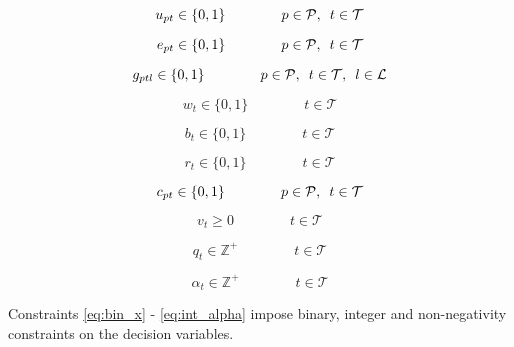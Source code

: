 \begin{equation} \label{eq:bin_u}
    u_{pt} \in \{0,1\} \qquad\qquad p \in \mathcal{P}, \enskip t \in \mathcal{T} 
\end{equation}

\begin{equation} \label{eq:nonn_e}
    e_{pt} \in \{0,1\} \qquad\qquad p \in \mathcal{P}, \enskip t \in \mathcal{T} 
\end{equation}

\begin{equation} \label{eq:binf_g}
    g_{ptl} \in \{0,1\} \qquad\qquad p \in \mathcal{P}, \enskip t \in \mathcal{T},\enskip l \in \mathcal{L}
\end{equation}

\begin{equation} \label{eq:wildcard_bin_w}
    w_{t} \in \{0,1\} \qquad\qquad  t \in \mathcal{T}
\end{equation}

\begin{equation} \label{eq:bench_boost_bin_b}
    b_{t} \in \{0,1\} \qquad\qquad  t \in \mathcal{T}
\end{equation}

\begin{equation} \label{eq:free_hit_bin_r}
    r_{t} \in \{0,1\} \qquad\qquad  t \in \mathcal{T}
\end{equation}

\begin{equation} \label{eq:triple_captain_bin_c}
    c_{pt} \in \{0,1\} \qquad\qquad p \in \mathcal{P}, \enskip t \in \mathcal{T} 
\end{equation}

\begin{equation} \label{eq:nonn_v}
    v_{t} \geq 0 \qquad\qquad t \in \mathcal{T} 
\end{equation}

\begin{equation} \label{eq:int_q}
    q_{t} \in \mathbb{Z}^{+}  \qquad\qquad t \in \mathcal{T}
\end{equation}

\begin{equation} \label{eq:int_alpha}
    \alpha_{t} \in \mathbb{Z}^{+}  \qquad\qquad t \in \mathcal{T}
\end{equation}

Constraints \eqref{eq:bin_x} - \eqref{eq:int_alpha} impose binary, integer and non-negativity constraints on the decision variables.

